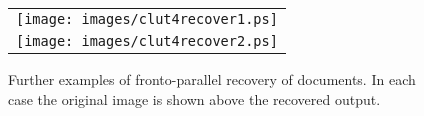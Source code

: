 \begin{figure}[t]
\begin{center}
{\begin{tabular}{c}
		\\
		\texttt{[image: images/clut4recover1.ps]}    \\
		\texttt{[image: images/clut4recover2.ps]}
	\end{tabular} \label{empprf}
}


\end{center}
\caption{Further examples of fronto-parallel recovery of documents. In each case the original image is shown above the recovered output.}
\label{againmoreppresults}
\end{figure}

